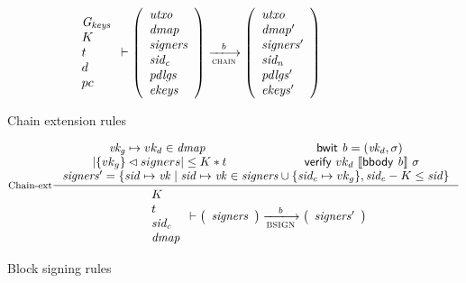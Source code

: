 \begin{figure}
\begin{equation}
{{\begin{array}{l}
         \Gkeys\\
         K\\
         t\\
         d\\
         pc
      \end{array}}
      \vdash
      {
        \left(
          \begin{array}{l}
            \var{utxo}\\
            \var{dmap}\\
            \var{signers}\\
            \var{sid_c}\\
            \var{pdlgs}\\
            \var{ekeys}
          \end{array}
        \right)
      }
      \trans{chain}{b}
      {
        \left(
          \begin{array}{l}
            \var{utxo}\\
            \var{dmap'}\\
            \var{signers'}\\
            \var{sid_n}\\
            \var{pdlgs'}\\
            \var{ekeys'}
          \end{array}
        \right)
      }
    }
  \end{equation}
  \caption{Chain extension rules}
  \label{fig:rules:chain-extension}
\end{figure}


\begin{figure}
  \begin{equation}
    \label{eq:rule:block-signing}
    \inference[Chain-ext]
    {\var{vk_g} \mapsto vk_d \in \var{dmap} & \bwit{b} = (\var{vk_d}, \sigma)\\
      \size{\{vk_g\} \restrictdom signers} \leq K * t &
      \verify{vk_d}{\serialised{\bbody{b}}}{\sigma} \\
      \var{signers'} =
         \{ \var{sid} \mapsto \var{vk}
          \mid  \var{sid} \mapsto \var{vk} \in \var{signers} \cup \{\var{sid_c} \mapsto vk_g\}
          , \var{sid_c} - K \leq \var{sid} \}
    }
    {
      {\begin{array}{l}
         K\\
         t\\
         \var{sid_c}\\
         \var{dmap}
      \end{array}}
      \vdash
      {
        \left(
          \begin{array}{l}
            \var{signers}
          \end{array}
        \right)
      }
      \trans{BSIGN}{b}
      {
        \left(
          \begin{array}{l}
            \var{signers'}
          \end{array}
        \right)
      }
    }
  \end{equation}
  \caption{Block signing rules}
  \label{fig:rules:block-signing}
\end{figure}
